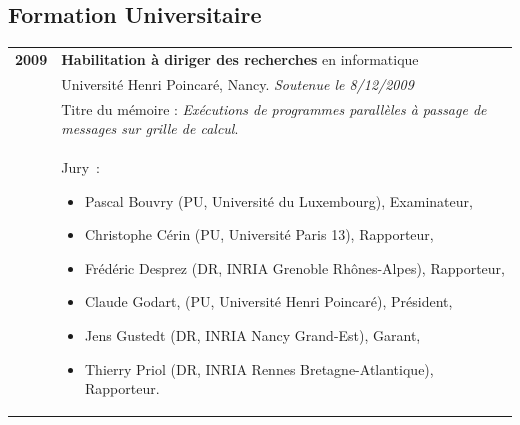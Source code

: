 \documentclass[11pt]{article}
\begin{document}

\subsection{Formation Universitaire}
\medskip
\noindent
\begin{tabular}{lp{14.8cm}}
	\textbf{2009} &  \textbf{Habilitation à diriger des recherches} en informatique \\
			  &	Université Henri Poincaré, Nancy. \textit{Soutenue le 8/12/2009}\\
      		  &	Titre du mémoire : {\em Exécutions de programmes parallèles à passage de messages sur grille de calcul}.\\
			  &	Jury~: 
				\begin{small}
				\begin{itemize}
				\item Pascal Bouvry (PU, Université du Luxembourg), Examinateur,
				\item Christophe Cérin (PU, Université Paris 13), Rapporteur,
				\item Frédéric Desprez (DR, INRIA Grenoble Rhônes-Alpes), Rapporteur,
				\item Claude Godart, (PU, Université Henri Poincaré), Président,
				\item Jens Gustedt (DR, INRIA Nancy Grand-Est), Garant,
				\item Thierry Priol (DR, INRIA Rennes Bretagne-Atlantique), Rapporteur.
				\end{itemize}
				\end{small}\\[2mm]
	


\end{tabular}
\end{document}
